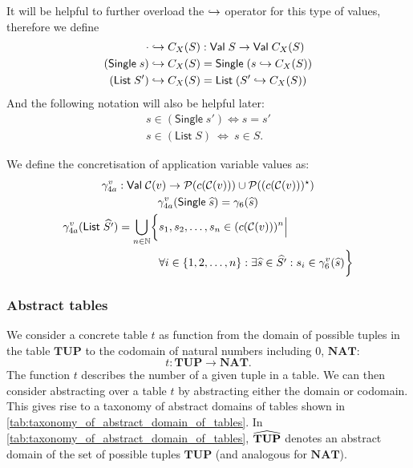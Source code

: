 It will be helpful to further overload the $\hookrightarrow$ operator for this type of values, therefore we define
\begin{align}
    \cdot \hookrightarrow C_X(S) &: \mathsf{Val} \; S \rightarrow \mathsf{Val} \; C_X(S) \\
    (\mathsf{Single} \; s) \hookrightarrow C_X(S) &= \mathsf{Single} \; (s \hookrightarrow C_X(S)) \\
    (\mathsf{List} \; S') \hookrightarrow C_X(S) &= \mathsf{List} \; (S' \hookrightarrow C_X(S))
\end{align}
And the following notation will also be helpful later:
\begin{align}
    s \in (\mathsf{Single} \; s') \iff s = s' \\
    s \in (\mathsf{List} \; S) \ \iff \ s \in S.
\end{align}

We define the concretisation of application variable values as:
\begin{gather}
    \gamma^v_{4a} : \mathsf{Val} \; \mathcal{C}(v) \rightarrow \mathcal{P}(c(\mathcal{C}(v))) \cup\mathcal{P}((c(\mathcal{C}(v)))^\star)\\
    \gamma^v_{4a}(\mathsf{Single} \; \widehat{s}) = \gamma_6(\widehat{s})\\
    \begin{split}
        \gamma^v_{4a}(\mathsf{List} \; \widehat{S'}) = \bigcup_{n \in \mathbb{N}}\biggl\{&s_1, s_2, \dots, s_n \in (c(\mathcal{C}(v)))^n \Big|\\
        &\forall i \in \{1, 2, \dots, n\} : \exists \widehat{s} \in \widehat{S'} : s_i \in \gamma^v_6(\widehat{s}) \biggr\}
    \end{split}
\end{gather}

\subsubsection{Abstract tables}\label{subsubsec:abstract_domain_of_tables}

We consider a concrete table $t$ as function from the domain of possible tuples in the table $\mathbf{TUP}$ to the codomain of natural numbers including $0$, $\mathbf{NAT}$:
\begin{equation}
    t : \mathbf{TUP} \rightarrow \mathbf{NAT}.
\end{equation}
The function $t$ describes the number of a given tuple in a table.
We can then consider abstracting over a table $t$ by abstracting either the domain or codomain.
This gives rise to a taxonomy of abstract domains of tables shown in \autoref{tab:taxonomy_of_abstract_domain_of_tables}.
In \autoref{tab:taxonomy_of_abstract_domain_of_tables}, $\widehat{\mathbf{TUP}}$ denotes an abstract domain of the set of possible tuples $\mathbf{TUP}$ (and analogous for $\mathbf{NAT}$).


